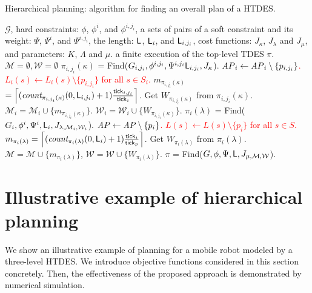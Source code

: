 \documentclass[journal,twoside,web]{IEEEtran}
\newcommand{\tick}{{\sf tick}}
\newcommand{\AP}{{\textit AP}}
\newcommand{\Len}{{\sf L}}
\newcommand{\M}{\mathcal{M}}
\newcommand{\W}{\mathcal{W}}
\newcommand{\red}[1]{\textcolor{red}{#1}}
\begin{document}
\begin{algorithm}
\caption{Hierarchical planning: algorithm for finding an overall plan of a HTDES.} \label{alg2}
\begin{algorithmic}
%
\Require $\mathcal{G}$, hard constraints: $\phi$, $\phi^i$, and $\phi^{i,j_i}$, a sets of pairs of a soft constraint and its weight: $\Psi$, $\Psi^i$, and $\Psi^{i,j_i}$, the length: $\Len$, $\Len_i$, and $\Len_{i,j_i}$, cost functions: $J_\kappa$, $J_{\lambda}$ and $J_{\mu}$, and parameters: $K$, $\Lambda$ and $\mu$.
\Ensure a finite execution of the top-level TDES $\pi$.
%
\State $\mathcal{M}=\emptyset,\mathcal{W}=\emptyset$
		\State ${\pi_{i,j_i}(\kappa)}$ = Find($G_{i,j_i},\phi^{i,j_i},\Psi^{i,j_i}\Len_{i,j_i},J_\kappa$).
		\State \red{$\AP_i\leftarrow \AP_i\setminus \{p_{i,j_i}\}$.}
		\State \red{$L_i(s)\leftarrow L_i(s)\setminus \{p_{i,j_i}\}$ for all $s\in S_i$.}
		\Else
		\State $m_{\pi_{i,j_i}(\kappa)}$
		\State \hspace{0.8cm}$=\left\lceil (\textit{count}_{\pi_{i,j_i}(\kappa)}(0,\Len_{i,j_i})+1)\frac{\tick_{i,j_i}}{\tick_i} \right\rceil $.
		\State Get $W_{\pi_{i,j_i}(\kappa)}$ from $\pi_{i,j_i}(\kappa)$.
		\State $\mathcal{M}_i=\mathcal{M}_i\cup\{m_{\pi_{i,j_i}(\kappa)}\}$.
		\State $\mathcal{W}_i=\mathcal{W}_i\cup\{W_{\pi_{i,j_i}(\kappa)}\}$.
		\EndIf
	\EndFor
\EndFor
\EndFor
{}
\For{ $\lambda\in \Lambda$}
		\State ${\pi_i(\lambda)}$ = Find($G_i,\phi^i,\Psi^i,\Len_i,J_{\lambda,\M_i,\W_i}$).
		\State \red{$\AP\leftarrow \AP\setminus \{p_{i}\}$.}
		\State \red{$L(s)\leftarrow L(s)\setminus \{p_{i}\}$ for all $s\in S$.}
		\Else
		\State $m_{\pi_i(\lambda)}=\left\lceil (\textit{count}_{\pi_i(\lambda)}(0,\Len_i)+1)\frac{\tick_i}{\tick_p} \right\rceil $.
		\State Get $W_{\pi_i(\lambda)}$ from $\pi_i(\lambda)$.
		\State $\mathcal{M}=\mathcal{M}\cup\{m_{\pi_i(\lambda)}\}$, $\mathcal{W}=\mathcal{W}\cup\{W_{\pi_i(\lambda)}\}$.
		\EndIf
\EndFor
\EndFor
%
\State ${\pi}$ = Find($G,\phi,\Psi,\Len,J_{\mu,\M,\W}$).
\end{algorithmic}
\end{algorithm}
%
%
%
\section{Illustrative example of hierarchical planning}\label{simResult}
%
%
%
We show an illustrative example of planning for a mobile robot modeled by a three-level HTDES. %
We introduce objective functions considered in this section concretely.
Then, the effectiveness of the proposed approach is demonstrated by numerical simulation.
%
\end{document}
